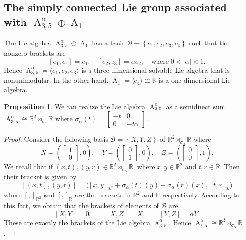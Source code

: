 \documentclass[12pt,a4paper,twoside]{article}
\theoremstyle{definition}
\newtheorem{proposition}{Proposition}[section]
\begin{document}
\subsection{The simply connected Lie group associated with $\operatorname{A}_{3, 5}^{\alpha} \oplus \operatorname{A}_1$}
The Lie algebra $\operatorname{A}_{3, 5}^{\alpha} \oplus \operatorname{A}_1$ has a basis $\mathcal{B} = \left\lbrace e_1, e_2, e_3, e_4\right\rbrace$ such that the nonzero brackets are 
$$[e_1, e_3] = e_1,\quad [e_2, e_3] = \alpha e_2,\quad \text{where}\; 0 < |\alpha| < 1.$$
Hence $\operatorname{A}_{3, 5}^{\alpha} = \langle e_1, e_2, e_3\rangle$ is a three-dimensional solvable Lie algebra that is nonunimodular. In the other hand, $\operatorname{A}_1 = \langle e_4\rangle \cong \mathbb{R}$ is a one-dimensional Lie algebra.
\begin{proposition}
We can realize the Lie algebra $\operatorname{A}_{3, 5}^{\alpha}$ as a semidirect sum $\operatorname{A}_{3, 5}^{\alpha} \cong \mathbb{R}^2 \rtimes_{\sigma_{\alpha}}\mathbb{R}$ where $\sigma_{\alpha}(t) = \begin{bmatrix}
-t & 0\\
0 & -t\alpha
\end{bmatrix}$.
\end{proposition}
\begin{proof}
Consider the following basis $\mathscr{B} = \left\lbrace X, Y, Z\right\rbrace$ of $\mathbb{R}^2 \rtimes_{\sigma_{\alpha}}\mathbb{R}$ where
$$X = \left(\begin{bmatrix}
1\\
0
\end{bmatrix}, 0 \right), \quad Y = \left(\begin{bmatrix}
0\\
1
\end{bmatrix}, 0 \right), \quad Z = \left(\begin{bmatrix}
0\\
0
\end{bmatrix}, 1 \right).$$
We recall that if $(x, t), (y, r) \in \mathbb{R}^2 \rtimes_{\sigma_{\alpha}}\mathbb{R}$, where $x, y \in \mathbb{R}^2$ and $t, r \in \mathbb{R}$. Then their bracket is given by
$$[(x, t), (y, r)] = \big([x, y]_{\mathbb{R}^2} + \sigma_{\alpha}(t)(y) - \sigma_{\alpha}(r)(x), [t, r]_{\mathbb{R}}\big)$$
where $[, ]_{\mathbb{R}^2}$ and $[, ]_{\mathbb{R}}$ are the brackets in $\mathbb{R}^2$ and $\mathbb{R}$ respectively. According to this fact, we obtain that the brackets of elements of $\mathscr{B}$ are
$$[X, Y] = 0, \qquad [X, Z] = X, \qquad [Y, Z] = \alpha Y.$$
These are exactly the brackets of the Lie algebra $\operatorname{A}_{3, 5}^{\alpha}$. Hence $\operatorname{A}_{3, 5}^{\alpha} \cong \mathbb{R}^2 \rtimes_{\sigma_{\alpha}}\mathbb{R}$.
\end{proof}
\end{document}
